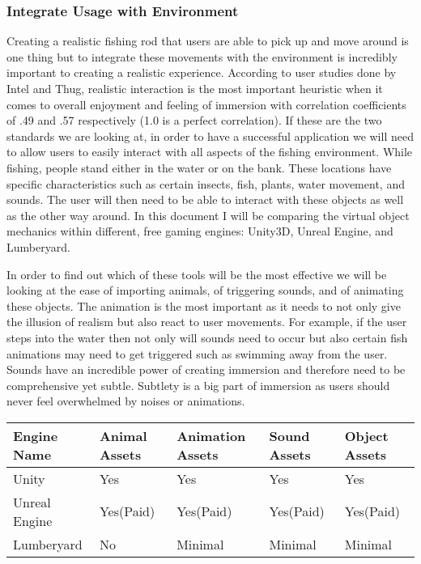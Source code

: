 \documentclass[10pt,journal,compsoc,onecolumn, draftclsnofoot]{IEEEtran}
\begin{document}
\subsubsection{Integrate Usage with Environment}
Creating a realistic fishing rod that users are able to pick up and move around is one thing but to integrate these movements with the environment is incredibly important to creating a realistic experience.
According to user studies done by Intel and Thug\cite{michalak_lind_round1}, realistic interaction is the most important heuristic when it comes to overall enjoyment and feeling of immersion with correlation coefficients of .49 and .57 respectively (1.0 is a perfect correlation).
If these are the two standards we are looking at, in order to have a successful application we will need to allow users to easily interact with all aspects of the fishing environment.
While fishing, people stand either in the water or on the bank.
These locations have specific characteristics such as certain insects, fish, plants, water movement, and sounds.
The user will then need to be able to interact with these objects as well as the other way around.
In this document I will be comparing the virtual object mechanics within different, free gaming engines: Unity3D, Unreal Engine, and Lumberyard.

In order to find out which of these tools will be the most effective we will be looking at the ease of importing animals, of triggering sounds, and of animating these objects.
The animation is the most important as it needs to not only give the illusion of realism but also react to user movements.
For example, if the user steps into the water then not only will sounds need to occur but also certain fish animations may need to get triggered such as swimming away from the user.
Sounds have an incredible power of creating immersion and therefore need to be comprehensive yet subtle.
Subtlety is a big part of immersion as users should never feel overwhelmed by noises or animations.

\vspace{2mm}
\begin{table}[h!]
\centering
  \begin{tabu} to 1.0\textwidth { | X[l] || X[c] | X[c] | X[c] | X[c] |  }
  \hline
  Engine Name & Animal Assets & Animation Assets & Sound Assets & Object Assets\\
  \hline
  Unity  & Yes & Yes & Yes & Yes\\
  Unreal Engine &   Yes(Paid) & Yes(Paid) & Yes(Paid) & Yes(Paid)\\
  Lumberyard & No & Minimal & Minimal & Minimal \\
  \hline
  \end{tabu}
\end{table}
\vspace{2mm}
\end{document}
